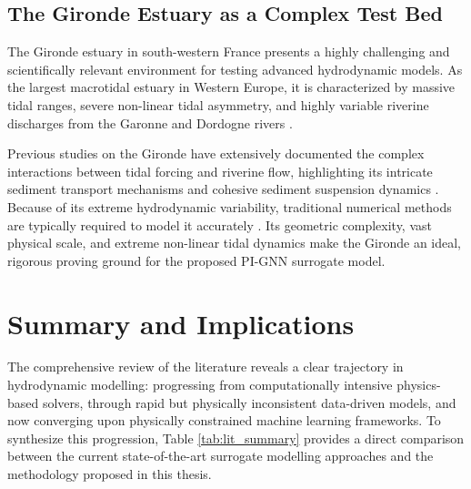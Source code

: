 \subsection{The Gironde Estuary as a Complex Test Bed}

The Gironde estuary in south-western France presents a highly challenging and scientifically relevant environment for testing advanced hydrodynamic models. As the largest macrotidal estuary in Western Europe, it is characterized by massive tidal ranges, severe non-linear tidal asymmetry, and highly variable riverine discharges from the Garonne and Dordogne rivers \cite{Sottolichio2000, Jalón-Rojas2018}. 

Previous studies on the Gironde have extensively documented the complex interactions between tidal forcing and riverine flow, highlighting its intricate sediment transport mechanisms and cohesive sediment suspension dynamics \cite{Toublanc2015}. Because of its extreme hydrodynamic variability, traditional numerical methods are typically required to model it accurately \cite{GirondeTidal2019}. Its geometric complexity, vast physical scale, and extreme non-linear tidal dynamics make the Gironde an ideal, rigorous proving ground for the proposed PI-GNN surrogate model.

\section{Summary and Implications}

The comprehensive review of the literature reveals a clear trajectory in hydrodynamic modelling: progressing from computationally intensive physics-based solvers, through rapid but physically inconsistent data-driven models, and now converging upon physically constrained machine learning frameworks. To synthesize this progression, Table \ref{tab:lit_summary} provides a direct comparison between the current state-of-the-art surrogate modelling approaches and the methodology proposed in this thesis.

